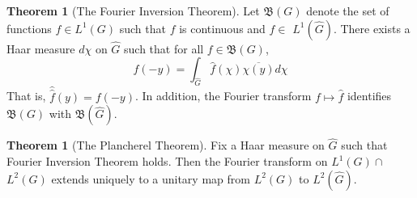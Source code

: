 \documentclass[12pt,a4paper]{book}
\theoremstyle{definition}
\newtheorem{theo}[defn]{Theorem}
\begin{document}
\begin{theo}[The Fourier Inversion Theorem]
    Let $\mathfrak{B}(G)$ denote the set of functions $f \in L^1(G)$ such that $f$ is continuous and $\hat{f} \in$ $L^1(\hat{G})$. There exists a Haar measure $d \chi$ on $\hat{G}$ such that for all $f \in \mathfrak{B}(G)$,
    $$
        f(-y)=\int_{\hat{G}} \hat{f}(\chi) \overline{\chi(y)} d \chi
    $$
    That is, $\hat{\hat{f}}(y)=f(-y)$. In addition, the Fourier transform $f \mapsto \hat{f}$ identifies $\mathfrak{B}(G)$ with $\mathfrak{B}(\hat{G})$.
\end{theo}
\begin{theo}[The Plancherel Theorem]
    Fix a Haar measure on $\hat{G}$ such that Fourier Inversion Theorem holds. 
    Then the Fourier transform on $L^1(G) \cap$ $L^2(G)$ extends uniquely to a unitary map
    from $L^2(G)$ to $L^2(\widehat{G})$.
\end{theo}
\end{document}
